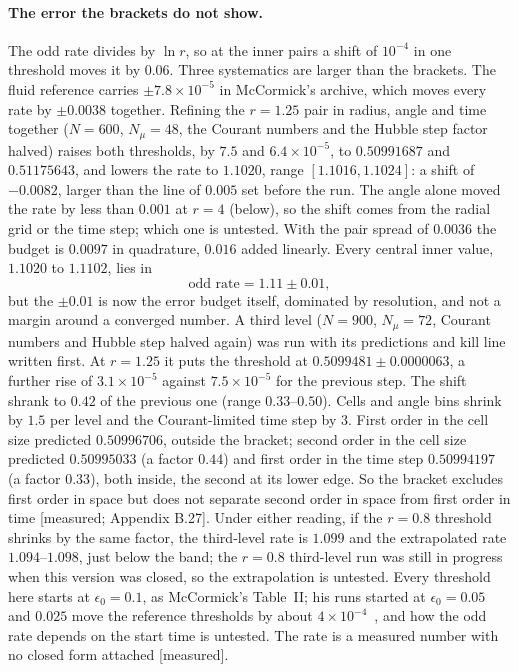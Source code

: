 \documentclass[11pt]{article}
\newcommand{\grade}[1]{\textsf{\small[#1]}}
\begin{document}
\paragraph{The error the brackets do not show.} The odd rate divides by $\ln r$, so at the inner pairs a shift of $10^{-4}$ in one threshold moves it by $0.06$. Three systematics are larger than the brackets. The fluid reference carries $\pm7.8\times10^{-5}$ in McCormick's archive, which moves every rate by $\pm0.0038$ together. Refining the $r=1.25$ pair in radius, angle and time together ($N=600$, $N_\mu=48$, the Courant numbers and the Hubble step factor halved) raises both thresholds, by $7.5$ and $6.4\times10^{-5}$, to $0.50991687$ and $0.51175643$, and lowers the rate to $1.1020$, range $[1.1016,1.1024]$: a shift of $-0.0082$, larger than the line of $0.005$ set before the run. The angle alone moved the rate by less than $0.001$ at $r=4$ (below), so the shift comes from the radial grid or the time step; which one is untested. With the pair spread of $0.0036$ the budget is $0.0097$ in quadrature, $0.016$ added linearly. Every central inner value, $1.1020$ to $1.1102$, lies in
\begin{equation}
\text{odd rate}=1.11\pm0.01,
\end{equation}
but the $\pm0.01$ is now the error budget itself, dominated by resolution, and not a margin around a converged number. A third level ($N=900$, $N_\mu=72$, Courant numbers and Hubble step halved again) was run with its predictions and kill line written first. At $r=1.25$ it puts the threshold at $0.5099481\pm0.0000063$, a further rise of $3.1\times10^{-5}$ against $7.5\times10^{-5}$ for the previous step. The shift shrank to $0.42$ of the previous one (range $0.33$--$0.50$). Cells and angle bins shrink by $1.5$ per level and the Courant-limited time step by $3$. First order in the cell size predicted $0.50996706$, outside the bracket; second order in the cell size predicted $0.50995033$ (a factor $0.44$) and first order in the time step $0.50994197$ (a factor $0.33$), both inside, the second at its lower edge. So the bracket excludes first order in space but does not separate second order in space from first order in time \grade{measured; Appendix B.27}. Under either reading, if the $r=0.8$ threshold shrinks by the same factor, the third-level rate is $1.099$ and the extrapolated rate $1.094$--$1.098$, just below the band; the $r=0.8$ third-level run was still in progress when this version was closed, so the extrapolation is untested. Every threshold here starts at $\epsilon_0=0.1$, as McCormick's Table~II; his runs started at $\epsilon_0=0.05$ and $0.025$ move the reference thresholds by about $4\times10^{-4}$~\cite{McCcode}, and how the odd rate depends on the start time is untested. The rate is a measured number with no closed form attached \grade{measured}.
\end{document}
